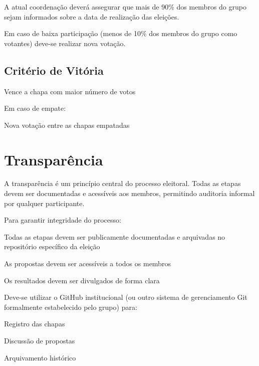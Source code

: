 \documentclass[
  12pt,          %
  a4paper,       %
  oneside,       %
  brazil         %
]{article}
\begin{document}
\begin{conduta}
	\item A atual coordenação deverá assegurar que mais de 90\% dos membros do grupo sejam informados sobre a data de realização das eleições.
	\item Em caso de baixa participação (menos de 10\% dos membros do grupo como votantes) deve-se realizar nova votação.
\end{conduta}

\subsection{Critério de Vitória}

\begin{conduta}
	\item Vence a chapa com maior número de votos
	\item Em caso de empate:
	\begin{conduta}
		\item Nova votação entre as chapas empatadas
	\end{conduta}
\end{conduta}

\section{Transparência}

A transparência é um princípio central do processo eleitoral. 
Todas as etapas devem ser documentadas e acessíveis aos membros, permitindo auditoria informal por qualquer participante.

Para garantir integridade do processo:

\begin{conduta}
	\item Todas as etapas devem ser publicamente documentadas e arquivadas no repositório específico da eleição
	\item As propostas devem ser acessíveis a todos os membros
	\item Os resultados devem ser divulgados de forma clara
\end{conduta}

Deve-se utilizar o GitHub institucional (ou outro sistema de gerenciamento Git formalmente estabelecido pelo grupo) para:

\begin{conduta}
	\item Registro das chapas
	\item Discussão de propostas
	\item Arquivamento histórico
\end{conduta}
\end{document}
